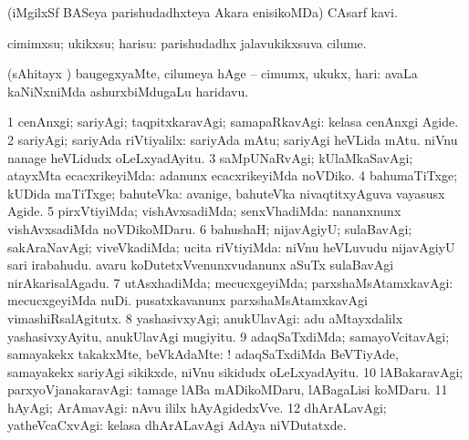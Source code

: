\noindent 
\gl{\pagu}
\expl{}
\bmng
{} (iMgilxSf BASeya parishudadhxteya Akara enisikoMDa) CAsarf kavi. 
\emng
\eentry

\bentry
{} 
\gl{\sakirx}
\expl{}
\bmng
cimimxsu; ukikxsu; harisu:  parishudadhx jalavukikxsuva cilume. 
\emng

\noindent 
\gl{\akirx}
\expl{}
\bmng
(sAhitayx \parx) baugegxyaMte, cilumeya hAge -- cimumx, ukukx, hari:  avaLa kaNiNxniMda ashurxbiMdugaLu haridavu. 
\emng
\eentry

\bentry
{} 
\gl{\kirxvi}
\bmng
\bnum
\num{1} cenAnxgi; sariyAgi; taqpitxkaravAgi; samapaRkavAgi:  kelasa cenAnxgi Agide. 
\num{2} sariyAgi; sariyAda riVtiyalilx:  sariyAda mAtu; sariyAgi heVLida mAtu.  niVnu nanage heVLidudx oLeLxyadAyitu. 
\num{3} saMpUNaRvAgi; kUlaMkaSavAgi; atayxMta ecacxrikeyiMda:  adanunx ecacxrikeyiMda noVDiko. 
\num{4} bahumaTiTxge; kUDida maTiTxge; bahuteVka:  avanige, bahuteVka nivaqtitxyAguva vayasusx Agide. 
\num{5} pirxVtiyiMda; vishAvxsadiMda; senxVhadiMda:  nananxnunx vishAvxsadiMda noVDikoMDaru. 
\num{6} bahushaH; nijavAgiyU; sulaBavAgi; sakAraNavAgi; viveVkadiMda; ucita riVtiyiMda:  niVnu heVLuvudu nijavAgiyU sari irabahudu.  avaru koDutetxVvenunxvudanunx aSuTx sulaBavAgi nirAkarisalAgadu. 
\num{7} utAsxhadiMda; mecucxgeyiMda; parxshaMsAtamxkavAgi:  mecucxgeyiMda nuDi.  pusatxkavanunx parxshaMsAtamxkavAgi vimashiRsalAgitutx. 
\num{8} yashasivxyAgi; anukUlavAgi:  adu aMtayxdalilx yashasivxyAyitu, anukUlavAgi mugiyitu. 
\num{9} adaqSaTxdiMda; samayoVcitavAgi; samayakekx takakxMte, beVkAdaMte: ! adaqSaTxdiMda BeVTiyAde, samayakekx sariyAgi sikikxde, niVnu sikidudx oLeLxyadAyitu. 
\num{10} lABakaravAgi; parxyoVjanakaravAgi:  tamage lABa mADikoMDaru, lABagaLisi koMDaru. 
\num{11} hAyAgi; ArAmavAgi:  nAvu ililx hAyAgidedxVve. 
\num{12} dhArALavAgi; yatheVcaCxvAgi:  kelasa dhArALavAgi AdAya niVDutatxde. 
\enum
\emng

